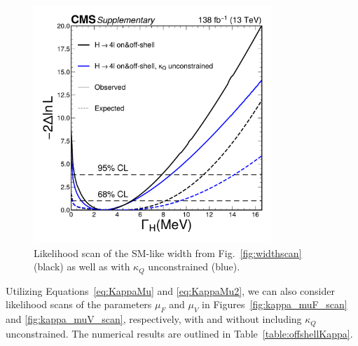 \begin{figure}[!hbt]
    \centering
    \includegraphics[width=0.8\textwidth]{figures/Gamma_scan.pdf}
    \caption{
   Likelihood scan of the SM-like \Hboson width from Fig.~\ref{fig:widthscan} (black) as well as with $\kappa_Q$ unconstrained (blue).
    }
    \label{fig:kappa_width_scan}
\end{figure}

Utilizing Equations~\ref{eq:KappaMu} and \ref{eq:KappaMu2}, we can also consider likelihood scans of the parameters $\mu_F$ and $\mu_V$ in Figures~\ref{fig:kappa_muF_scan} and \ref{fig:kappa_muV_scan}, respectively, with and without including $\kappa_Q$ unconstrained. The numerical results are outlined in Table~\ref{table:offshellKappa}.\\

